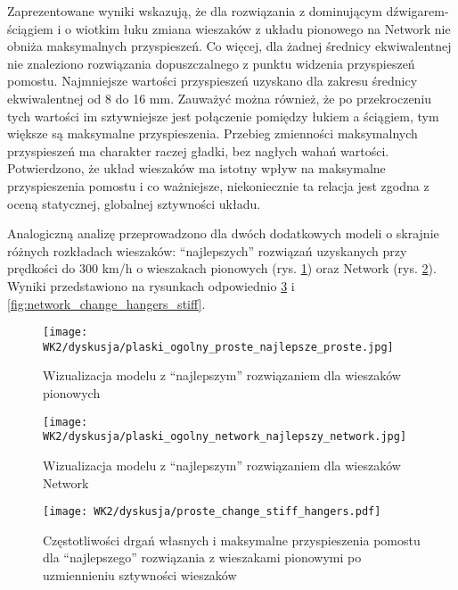 Zaprezentowane wyniki wskazują, że dla rozwiązania z dominującym dźwigarem-ściągiem i o wiotkim łuku zmiana wieszaków z układu pionowego na Network nie obniża maksymalnych przyspieszeń. Co więcej, dla żadnej średnicy ekwiwalentnej nie znaleziono rozwiązania dopuszczalnego z punktu widzenia przyspieszeń pomostu. Najmniejsze wartości przyspieszeń uzyskano dla zakresu średnicy ekwiwalentnej od 8 do 16 mm. Zauważyć można również, że po przekroczeniu tych wartości im sztywniejsze jest połączenie pomiędzy łukiem a ściągiem, tym większe są maksymalne przyspieszenia. Przebieg zmienności maksymalnych przyspieszeń ma charakter raczej gładki, bez nagłych wahań wartości. Potwierdzono, że układ wieszaków ma istotny wpływ na maksymalne przyspieszenia pomostu i co ważniejsze, niekoniecznie ta relacja jest zgodna z oceną statycznej, globalnej sztywności układu. 

Analogiczną analizę przeprowadzono dla dwóch dodatkowych modeli o skrajnie różnych rozkładach wieszaków: \enquote{najlepszych} rozwiązań uzyskanych przy prędkości do 300 km/h o wieszakach pionowych (rys. \ref{fig:proste_najlepsze_wiz}) oraz Network (rys. \ref{fig:network_najlepsze_wiz}). Wyniki przedstawiono na rysunkach odpowiednio \ref{fig:proste_change_hangers_stiff} i \ref{fig:network_change_hangers_stiff}. 

\begin{figure}[hbt!]
	\centering
	\texttt{[image: WK2/dyskusja/plaski\_ogolny\_proste\_najlepsze\_proste.jpg]}
	\captionsetup{justification=centering}
	\caption{Wizualizacja modelu z \enquote{najlepszym} rozwiązaniem dla wieszaków pionowych}
	\label{fig:proste_najlepsze_wiz}
\end{figure}

\begin{figure}[hbt!]
	\centering
	\texttt{[image: WK2/dyskusja/plaski\_ogolny\_network\_najlepszy\_network.jpg]}
	\captionsetup{justification=centering}
	\caption{Wizualizacja modelu z \enquote{najlepszym} rozwiązaniem dla wieszaków Network}
	\label{fig:network_najlepsze_wiz}
\end{figure}


\begin{figure}[hbt!]
	\centering
	\texttt{[image: WK2/dyskusja/proste\_change\_stiff\_hangers.pdf]}
	\captionsetup{justification=centering}
	\caption{Częstotliwości drgań własnych i maksymalne przyspieszenia pomostu dla \enquote{najlepszego} rozwiązania z wieszakami pionowymi po uzmiennieniu sztywności wieszaków}
	\label{fig:proste_change_hangers_stiff}
\end{figure}

